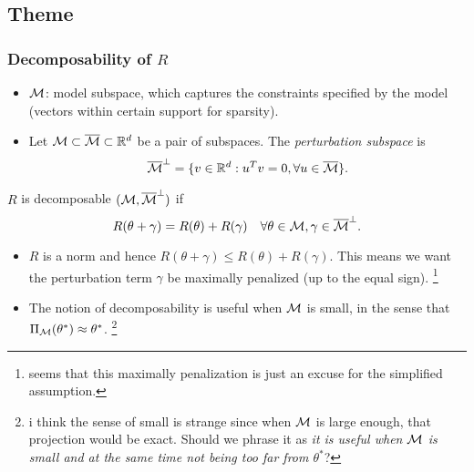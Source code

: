 \subsection{Theme}

\subsubsection{Decomposability of $R$}

\begin{itemize}
    \item $\mathcal{M}$: model subspace,
        which captures the constraints specified by the model
        (\eg vectors within certain support for sparsity).
    \item Let $\mathcal{M} \subset {\overline{\mathcal{M}}} \subset {\mathbb{R}}^d$ be a pair of subspaces.
        The \emph{perturbation subspace} is
        \begin{equation}
            {\overline{\mathcal{M}}}^\perp = \{v\in{\mathbb{R}}^d: u^Tv=0, \forall u\in{\overline{\mathcal{M}}}\}.
        \end{equation}
\end{itemize}

\begin{define}
    $R$ is decomposable \wrt $(\mathcal{M}, {\overline{\mathcal{M}}}^\perp)$ if
    \begin{equation}
        R(\theta+\gamma) = R(\theta) + R(\gamma) \quad
        \forall \theta \in \mathcal{M}, \gamma \in {\overline{\mathcal{M}}}^\perp.
    \end{equation}
\end{define}

\begin{obs} \leavevmode
\begin{itemize}
    \item $R$ is a norm and hence
        $R(\theta+\gamma)\le R(\theta) + R(\gamma)$.
        This means we want the perturbation term $\gamma$ be
        maximally penalized (up to the equal sign).
        \footnote{seems that this maximally penalization is just an excuse for
        the simplified assumption.}
    \item The notion of decomposability is useful when $\mathcal{M}$ is small,
        in the sense that $\Pi_{\mathcal{M}}(\theta^*)\approx\theta^*$.
        \footnote{i think the sense of small is strange since when
        $\mathcal{M}$ is large enough, that projection would be exact.
        Should we phrase it as
        \emph{it is useful when $\mathcal{M}$ is small and
        at the same time not being too far from $\theta^*$}?}
\end{itemize}
\end{obs}

